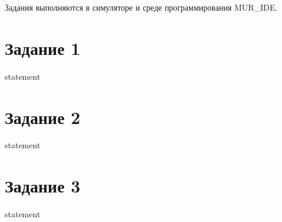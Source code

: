 Задания выполняются в симуляторе и среде программирования MUR\_IDE.

\section{Задание 1}
{statement}

\section{Задание 2}
{statement}

\section{Задание 3}
{statement}